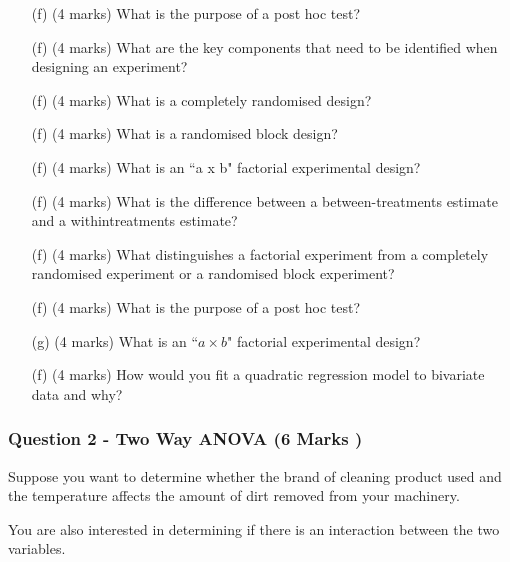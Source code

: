\documentclass[a4paper,12pt]{article}
\begin{document}
\begin{itemize}
	\item[(f)] (4 marks) What is the purpose of a post hoc test?
	\item[(f)] (4 marks) What are the key components that need to be identified when designing an
experiment?
	\item[(f)] (4 marks) What is a completely randomised design?
	\item[(f)] (4 marks) What is a randomised block design?
	\item[(f)] (4 marks) What is an ``a x b" factorial experimental design?
	\item[(f)] (4 marks)  What is the difference between a between-treatments estimate and a withintreatments
estimate?
	\item[(f)] (4 marks) What distinguishes a factorial experiment from a completely randomised experiment or a randomised block experiment?
	
	
	
	\item[(f)] (4 marks) What is the purpose of a post hoc test? 	
	
	\item[(g)] (4 marks) What is an ``$a \times b$" factorial experimental design?
	
	
	\item[(f)] (4 marks) How would you fit a quadratic regression model to bivariate data and why?
\end{itemize}	





\subsubsection*{Question 2 - Two Way ANOVA (6 Marks )}
\noindent Suppose you want to determine whether the brand of cleaning product used and the temperature affects the amount of dirt removed from your machinery. 

\noindent You are also interested in determining if there is an interaction between the two variables.
\end{document}
